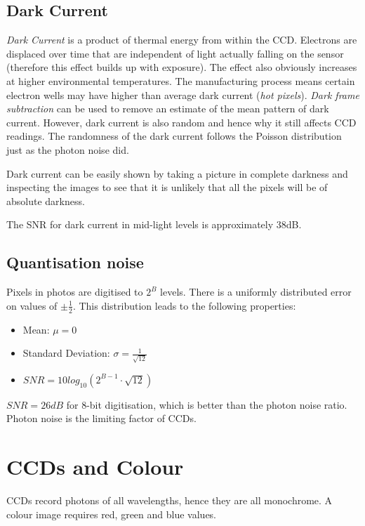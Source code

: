 \documentclass{article}
\begin{document}
\subsection{Dark Current}
{\it Dark Current} is a product of thermal energy from within the CCD.
Electrons are displaced over time that are independent of light actually falling on the sensor (therefore this effect builds up with exposure).
The effect also obviously increases at higher environmental temperatures.
The manufacturing process means certain electron wells may have higher than average dark current ({\it hot pixels}).
{\it Dark frame subtraction} can be used to remove an estimate of the mean pattern of dark current.
However, dark current is also random and hence why it still affects CCD readings.
The randomness of the dark current follows the Poisson distribution just as the photon noise did.

Dark current can be easily shown by taking a picture in complete darkness and inspecting the images to see that it is unlikely that all the pixels will be of absolute darkness.

The SNR for dark current in mid-light levels is approximately 38dB.

\subsection{Quantisation noise}
Pixels in photos are digitised to $2^B$ levels. There is a uniformly distributed error on values of $\pm\frac{1}{2}$. This distribution leads to the following properties:
\begin{itemize}
	\item Mean: $\mu = 0$
	\item Standard Deviation: $\sigma =\frac{1}{\sqrt{12}}$ 
	\item $SNR = 10log_{10}(2^{B-1}\cdot \sqrt{12})$
\end{itemize}

$SNR = 26dB$ for 8-bit digitisation, which is better than  the photon noise ratio. Photon noise is the limiting factor of CCDs.
\section{CCDs and Colour}
CCDs record photons of all wavelengths, hence they are all monochrome.
A colour image requires red, green and blue values.
\end{document}
